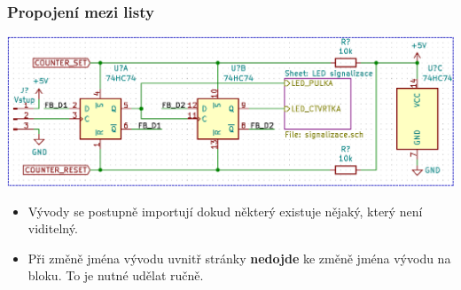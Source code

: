 \documentclass{beamer}
\begin{document}
\begin{frame}
	\frametitle{Propojení mezi listy}
	
	\begin{center}
		\includegraphics[width=\textwidth]{obr/dalsi_strana10.png}
	\end{center}
	
	\small
	
	\begin{itemize}
		\item Vývody se postupně importují dokud některý existuje nějaký, který není viditelný.
		\item Při změně jména vývodu uvnitř stránky \textbf{nedojde} ke změně jména vývodu na bloku. To je nutné udělat ručně.
	\end{itemize}
	
\end{frame}



\end{document}
